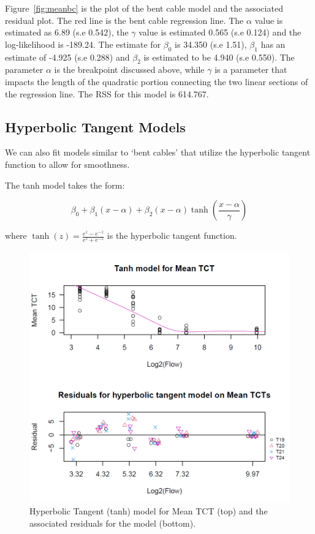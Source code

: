 Figure~\ref{fig:meanbc}  is the plot of the bent cable model and the associated residual plot. The red line is the bent cable regression line. The $\alpha$ value is estimated as 6.89 (s.e 0.542), the $\gamma$ value is estimated 0.565 (s.e 0.124) and the log-likelihood  is -189.24. The estimate for $\beta_{0}$ is 34.350 (s.e 1.51), $\beta_{1}$ has an estimate of -4.925 (s.e 0.288) and $\beta_{2}$ is estimated to be 4.940 (s.e 0.550). The parameter $\alpha$ is the breakpoint discussed above, while $\gamma$ is a parameter that impacts the length of the quadratic portion connecting the two linear sections of the regression line. The RSS for this model is 614.767. 

\newpage

\subsection{Hyperbolic Tangent Models}

We can also fit models similar to `bent cables' that utilize the hyperbolic tangent function to allow for smoothness.

\vspace{12pt}
 
The tanh model takes the form:

$$\beta_{0}+\beta_{1}(x-\alpha)+\beta_{2}(x-\alpha)\tanh(\frac{x-\alpha}{\gamma})$$

where $\tanh(z)=\frac{e^{z}-e^{-z}}{e^{z}+e^{-z}}$ is the hyperbolic tangent function.



\begin{figure}[H]
\includegraphics[scale=0.7]{Chapter4Images/tanhmodel.png}
\caption{Hyperbolic Tangent (tanh) model for Mean TCT (top) and the associated residuals for the model (bottom).}
\label{fig:meantanh}
\end{figure}


